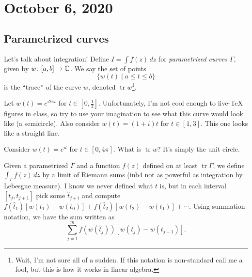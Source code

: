 \section{October 6, 2020}

\subsection{Parametrized curves}
Let's talk about integration! Define $I=\int f(z) \, dz$ for \emph{parametrized curves} $\Gamma$, given by $w \colon [a,b] \to \mathbb{C}$. We say the set of points \[
    \{w(t) \mid a\leq t \leq b\} 
\] is the ``trace'' of the curve $w$, denoted $\operatorname{tr}w$\footnote{Wait, I'm not sure all of a sudden. If this notation is non-standard call me a fool, but this is how it works in linear algebra.}. 
\begin{example}
    Let $w(t)=e^{i2\pi t}$ for $t\in [0,\frac{1}{2}]$. Unfortunately, I'm not cool enough to live-\TeX{} figures in class, so try to use your imagination to see what this curve would look like (a semicircle). Also consider $w(t)=(1+i)t$ for $t\in [1,3]$. This one looks like a straight line.
\end{example}
\begin{example}
    Consider $w(t)=e^{it}$ for $t\in [0,4\pi]$. What is $\operatorname{tr}w$? It's simply the unit circle.
\end{example}
Given a parametrized $\Gamma$ and a function $f(z)$ defined on at least $\operatorname{tr}\Gamma$, we define $\int_{\Gamma} f(z) \, dz$ by a limit of Riemann sums (inb4 not as powerful as integration by Lebesgue measure). I know we never defined what $t$ is, but in each interval $[t_j,t_{j+1}]$ pick some $\hat{t}_{j+i}$ and compute $f(\hat{t}_{1})[w(t_1)-w(t_0)]+f(\hat{t}_2)[w(t_2)-w(t_1)]+\cdots$. Using summation notation, we have the sum written as \[
    \sum_{j=1}^{m} f(w(\hat{t}_j))[w(t_j)-w(t_{j-1})].
\] 

